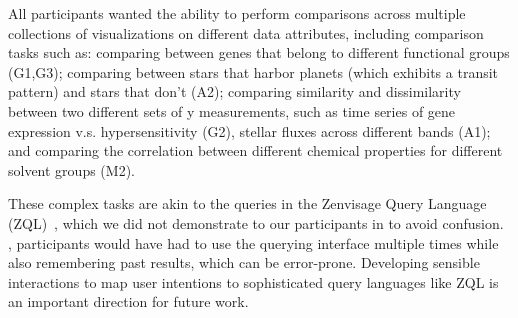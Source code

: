 \par All participants wanted the ability to perform comparisons across multiple collections of visualizations on different data attributes, including comparison tasks such as:
comparing between genes that belong to different functional groups (G1,G3); 
comparing between stars that harbor planets (which exhibits a transit pattern) and stars that don't (A2);
comparing similarity and dissimilarity between two different sets of y measurements, such as time series of gene expression v.s. hypersensitivity (G2), stellar fluxes across different bands (A1); and comparing the correlation between different chemical properties for different solvent groups (M2).
\par These complex tasks are akin to the queries in the Zenvisage Query Language (ZQL)~\cite{Siddiqui2017}, which we did not demonstrate to our participants in \ourVQS to avoid confusion. ,  participants would have had to use the querying interface multiple times while also remembering past results, which can be error-prone. Developing sensible interactions to map user intentions to sophisticated query languages like ZQL is an important direction for future work. 


